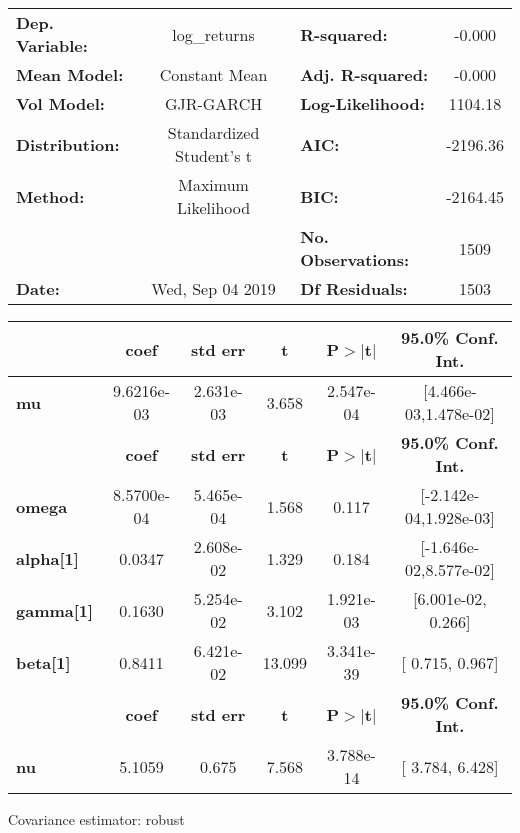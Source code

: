 \begin{center}
\begin{tabular}{lclc}
\toprule
\textbf{Dep. Variable:} &       log\_returns       & \textbf{  R-squared:         } &    -0.000   \\
\textbf{Mean Model:}    &      Constant Mean       & \textbf{  Adj. R-squared:    } &    -0.000   \\
\textbf{Vol Model:}     &        GJR-GARCH         & \textbf{  Log-Likelihood:    } &    1104.18  \\
\textbf{Distribution:}  & Standardized Student's t & \textbf{  AIC:               } &   -2196.36  \\
\textbf{Method:}        &    Maximum Likelihood    & \textbf{  BIC:               } &   -2164.45  \\
\textbf{}               &                          & \textbf{  No. Observations:  } &    1509     \\
\textbf{Date:}          &     Wed, Sep 04 2019     & \textbf{  Df Residuals:      } &    1503     \\
\bottomrule
\end{tabular}
\begin{tabular}{lccccc}
            & \textbf{coef} & \textbf{std err} & \textbf{t} & \textbf{P$> |$t$|$} & \textbf{95.0\% Conf. Int.}  \\
\midrule
\textbf{mu} &   9.6216e-03  &    2.631e-03     &     3.658  &      2.547e-04       &   [4.466e-03,1.478e-02]     \\
                  & \textbf{coef} & \textbf{std err} & \textbf{t} & \textbf{P$> |$t$|$} & \textbf{95.0\% Conf. Int.}  \\
\midrule
\textbf{omega}    &   8.5700e-04  &    5.465e-04     &     1.568  &          0.117       &   [-2.142e-04,1.928e-03]    \\
\textbf{alpha[1]} &       0.0347  &    2.608e-02     &     1.329  &          0.184       &   [-1.646e-02,8.577e-02]    \\
\textbf{gamma[1]} &       0.1630  &    5.254e-02     &     3.102  &      1.921e-03       &    [6.001e-02,  0.266]      \\
\textbf{beta[1]}  &       0.8411  &    6.421e-02     &    13.099  &      3.341e-39       &     [  0.715,  0.967]       \\
            & \textbf{coef} & \textbf{std err} & \textbf{t} & \textbf{P$> |$t$|$} & \textbf{95.0\% Conf. Int.}  \\
\midrule
\textbf{nu} &       5.1059  &        0.675     &     7.568  &      3.788e-14       &     [  3.784,  6.428]       \\
\bottomrule
\end{tabular}
\end{center}

Covariance estimator: robust
